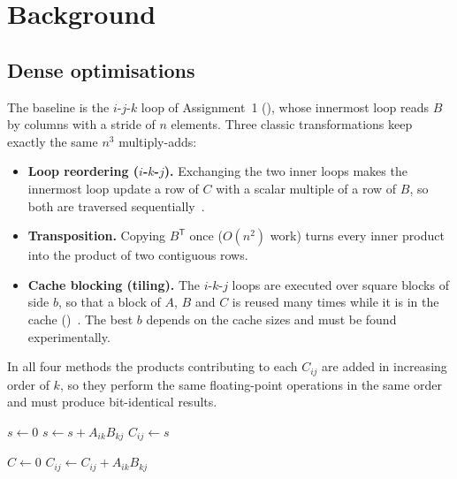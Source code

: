 \documentclass[12pt,a4paper]{report}
\begin{document}
\chapter{Background}

\section{Dense optimisations}

The baseline is the $i$-$j$-$k$ loop of Assignment~1 (), whose innermost loop reads $B$ by columns
with a stride of $n$ elements. Three classic transformations keep exactly the same $n^3$ multiply-adds:
\begin{itemize}
  \item \textbf{Loop reordering ($i$-$k$-$j$).} Exchanging the two inner loops makes the innermost loop update a row
  of $C$ with a scalar multiple of a row of $B$, so both are traversed sequentially~\cite{leiserson2020,drepper2007}.
  \item \textbf{Transposition.} Copying $B^{\mathsf T}$ once ($O(n^2)$ work) turns every inner product into the
  product of two contiguous rows.
  \item \textbf{Cache blocking (tiling).} The $i$-$k$-$j$ loops are executed over square blocks of side $b$, so that a
  block of $A$, $B$ and $C$ is reused many times while it is in the cache ()~\cite{lam1991,goto2008}.
  The best $b$ depends on the cache sizes and must be found experimentally.
\end{itemize}
In all four methods the products contributing to each $C_{ij}$ are added in increasing order of $k$, so they
perform the same floating-point operations in the same order and must produce bit-identical results.

\begin{algorithm}[H]
\caption{Baseline $i$-$j$-$k$ multiplication (Assignment~1)}
\label{alg:naive}
\begin{algorithmic}[1]
    \State $s \gets 0$
     \State $s \gets s + A_{ik} B_{kj}$ \EndFor
    \State $C_{ij} \gets s$
  \EndFor
\EndFor
\end{algorithmic}
\end{algorithm}

\begin{algorithm}[H]
\caption{Cache-blocked ($i$-$k$-$j$ inside blocks of side $b$) multiplication}
\label{alg:tiled}
\begin{algorithmic}[1]
\State $C \gets 0$
           \State $C_{ij} \gets C_{ij} + A_{ik} B_{kj}$ \EndFor
        \EndFor
      \EndFor
    \EndFor
  \EndFor
\EndFor
\end{algorithmic}
\end{algorithm}
\end{document}
